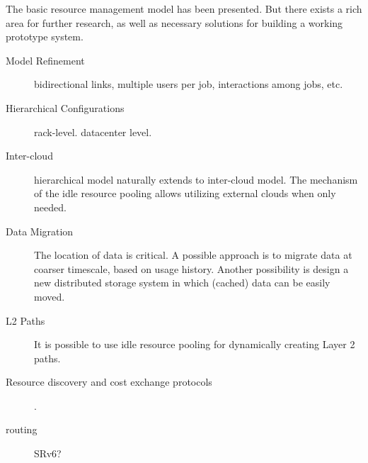 
The basic resource management model has been presented.
But there exists a rich area for further research, as well as
necessary solutions for building a working prototype system.

\begin{description}

\item[Model Refinement]  bidirectional links, multiple users per job,
            interactions among jobs, etc.

\item[Hierarchical Configurations]
            rack-level.  datacenter level.

\item[Inter-cloud]
            hierarchical model naturally extends to inter-cloud model.
            The mechanism of the idle resource pooling allows utilizing external
            clouds when only needed.

\item[Data Migration]
            The location of data is critical.
            A possible approach is to migrate data at coarser timescale, based
            on usage history.
            Another possibility is design a new distributed storage
            system in which (cached) data can be easily moved.

\item[L2 Paths] It is possible to use idle resource pooling for dynamically
            creating Layer 2 paths.

\item[Resource discovery and cost exchange protocols]
            \cite{Albrecht2008}.

\item[routing] SRv6?

\end{description}
